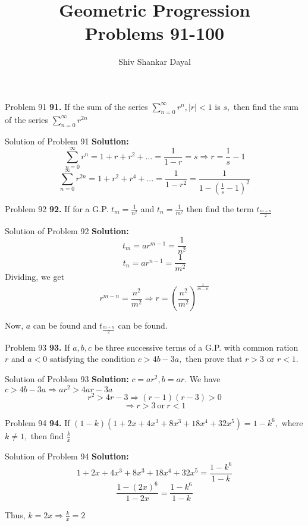 \documentclass[aspectratio=1610,8pt]{beamer}
\title{Geometric Progression\\Problems 91-100}
\author[Shiv Shankar Dayal]{Shiv Shankar Dayal}
\begin{document}
\begin{frame}
  \titlepage
\end{frame}
\begin{frame}{Problem 91}
  \textbf{91.} If the sum of the series $\sum_{n = 0}^\infty r^n, |r| < 1$ is $s,$ then find the sum of the series $\sum_{n =
    0}^\infty r^{2n}$
\end{frame}
\begin{frame}{Solution of Problem 91}
  \textbf{Solution:} $$\sum_{n = 0}^\infty r^n = 1 + r + r^2 + \ldots = \frac{1}{1 - r} = s \Rightarrow r = \frac{1}{s} - 1$$
  $$\sum_{n = 0}^\infty r^{2n} = 1 + r^2 + r^4 + \ldots = \frac{1}{1 - r^2} = \frac{1}{1 - \left(\frac{1}{s} - 1\right)^2}$$
\end{frame}
\begin{frame}{Problem 92}
  \textbf{92.} If for a G.P. $t_m = \frac{1}{n^2}$ and $t_n = \frac{1}{m^2}$ then find the term $t_{\frac{m + n}{2}}$
\end{frame}
\begin{frame}{Solution of Problem 92}
  \textbf{Solution:} $$t_m = ar^{m - 1} = \frac{1}{n^2}$$
  $$t_n = ar^{n - 1} = \frac{1}{m^2}$$
  Dividing, we get
  $$r^{m - n} = \frac{n^2}{m^2}\Rightarrow r = \left(\frac{n^2}{m^2}\right)^{\frac{1}{m - n}}$$

  Now, $a$ can be found and $t_{\frac{m + n}{2}}$ can be found.
\end{frame}
\begin{frame}{Problem 93}
  \textbf{93.} If $a, b, c$ be three successive terms of a G.P. with common ration $r$ and $a < 0$ satisfying the condition $c > 4b
  - 3a,$ then prove that $r > 3$ or $r < 1.$
\end{frame}
\begin{frame}{Solution of Problem 93}
  \textbf{Solution:} $c = ar^2, b = ar.$ We have $c > 4b - 3a \Rightarrow ar^2 > 4ar - 3a$
  $$r^2 > 4r - 3 \Rightarrow (r - 1)(r - 3)> 0$$
  $$\Rightarrow r > 3~\text{or}~r < 1$$
\end{frame}
\begin{frame}{Problem 94}
  \textbf{94.} If $(1 - k)(1 + 2x + 4x^3 + 8x^3 + 18x^4 + 32x^5) = 1 - k^6,$ where $k \neq 1,$ then find $\frac{k}{x}$
\end{frame}
\begin{frame}{Solution of Problem 94}
  \textbf{Solution:} $$1 + 2x + 4x^3 + 8x^3 + 18x^4 + 32x^5 = \frac{1 - k^6}{1 - k}$$
  $$\frac{1 - (2x)^6}{1 - 2x} = \frac{1 - k^6}{1 - k}$$

  Thus, $k = 2x \Rightarrow \frac{k}{x} = 2$
\end{frame}
\end{document}
